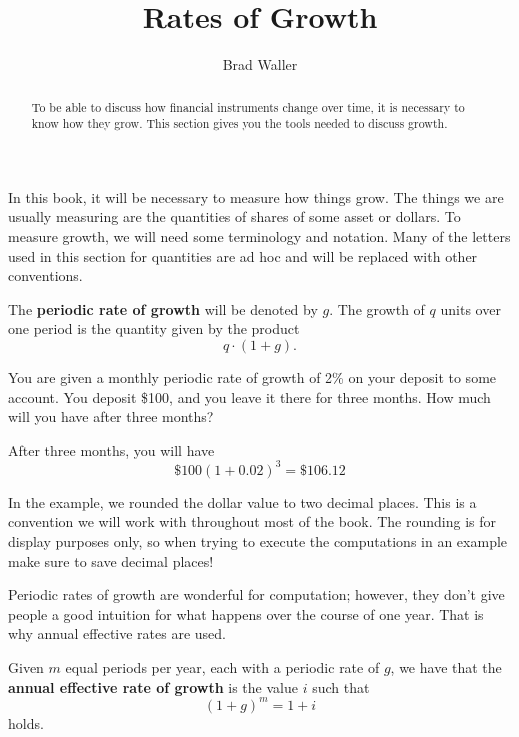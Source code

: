 \documentclass{ximera}
\author{Brad Waller}
\title{Rates of Growth}
\begin{document}
\begin{abstract}
To be able to discuss how financial instruments change over time, it is necessary to know how they grow. This section gives you the tools needed to discuss growth.
\end{abstract}

\maketitle

In this book, it will be necessary to measure how things grow. The things we are usually measuring are the quantities of shares of some asset or dollars. To measure growth, we will need some terminology and notation. Many of the letters used in this section for quantities are ad hoc and will be replaced with other conventions. 

\begin{definition}
The {\bf periodic rate of growth} will be denoted by $g$. The growth of $q$ units over one period is the quantity given by the product
	\begin{equation*}
		q\cdot(1+g).
	\end{equation*}
\end{definition}

\begin{example}
You are given a monthly periodic rate of growth of 2\% on your deposit to some account. You deposit \$100, and you leave it there for three months. How much will you have after three months? 
\end{example}

\begin{solution}
After three months, you will have
	\begin{equation*}
		\$100(1+0.02)^3=\$106.12
	\end{equation*}
\end{solution}

In the example, we rounded the dollar value to two decimal places. This is a convention we will work with throughout most of the book. The rounding is for display purposes only, so when trying to execute the computations in an example make sure to save decimal places!

Periodic rates of growth are wonderful for computation; however, they don't give people a good intuition for what happens over the course of one year. That is why annual effective rates are used.

\begin{definition}
Given $m$ equal periods per year, each with a periodic rate of $g$, we have that the {\bf annual effective rate of growth} is the value $i$ such that
	\begin{equation*}
		(1+g)^m=1+i
	\end{equation*}
holds.
\end{definition}
\end{document}
